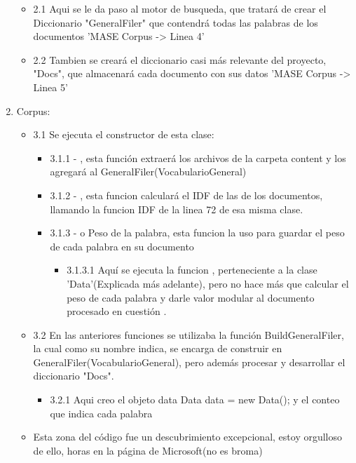 \documentclass{article}
\begin{document}
\begin{enumerate}
\begin{itemize}
\begin{itemize}
            \end{itemize}
            \item 2.1 Aqui se le da paso al motor de busqueda, que tratará de crear el Diccionario "GeneralFiler" que contendrá todas las palabras de los documentos 'MASE Corpus -> Linea 4'
            \item 2.2 Tambien se creará el diccionario casi más relevante del proyecto, "Docs", que almacenará cada documento con sus datos 'MASE Corpus -> Linea 5'
        \end{itemize}
    \item Corpus:
        \begin{itemize}
            \item 3.1 Se ejecuta el constructor de esta clase:
            \begin{itemize}
                \item 3.1.1 - , esta función extraerá los archivos de la carpeta content y los agregará al GeneralFiler(VocabularioGeneral)
                \item 3.1.2 - , esta funcion calculará el IDF de las de los documentos, llamando la funcion IDF de la linea 72 de esa misma clase.
                \item 3.1.3 - o Peso de la palabra, esta funcion la uso para guardar el peso de cada palabra en su documento
                    \begin{itemize}
                        \item 3.1.3.1 Aquí se ejecuta la funcion , perteneciente a la clase 'Data'(Explicada más adelante), pero no hace más que calcular el peso de cada palabra y darle valor modular al documento procesado en cuestión .
                    \end{itemize}
            \end{itemize}
            \item 3.2 En las anteriores funciones se utilizaba la función BuildGeneralFiler, la cual como su nombre indica, se encarga de construir en GeneralFiler(VocabularioGeneral), pero además procesar y desarrollar el diccionario "Docs".
                \begin{itemize}
                    \item 3.2.1 Aqui creo el objeto data Data data = new Data(); y el conteo que indica cada palabra 
                \end{itemize}
            \item Esta zona del código fue un descubrimiento excepcional, estoy orgulloso de ello, horas en la página de Microsoft(no es broma)
            

\end{itemize}
\end{enumerate}
\end{document}
